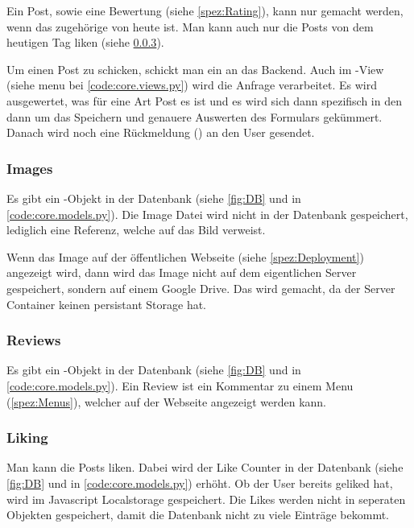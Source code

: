 Ein Post, sowie eine Bewertung (siehe \ref{spez:Rating}), kann nur gemacht
werden, wenn das zugehörige  von heute ist. Man kann auch nur die
Posts von dem heutigen Tag liken (siehe \ref{spez:Liking}).

Um einen Post zu schicken, schickt man ein  an das Backend.
Auch im -View (siehe menu bei {\ref{code:core.views.py}}) wird die
Anfrage verarbeitet. Es wird ausgewertet, was für eine Art Post es ist und es
wird sich dann spezifisch in den  dann um das Speichern
und genauere Auswerten des Formulars gekümmert. Danach wird noch eine
Rückmeldung () an den User gesendet.

\subsubsection{Images} \label{spez:Images}

Es gibt ein -Objekt in der Datenbank (siehe \ref{fig:DB} und in
\ref{code:core.models.py}). Die Image Datei wird nicht in der Datenbank
gespeichert, lediglich eine Referenz, welche auf das Bild verweist.

Wenn das Image auf der öffentlichen Webseite (siehe \ref{spez:Deployment}) angezeigt wird, dann
wird das Image nicht auf dem eigentlichen Server gespeichert, sondern auf einem
Google Drive. Das wird gemacht, da der Server Container keinen persistant
Storage hat.

\subsubsection{Reviews} \label{spez:Reviews}

Es gibt ein -Objekt in der Datenbank (siehe \ref{fig:DB} und in
\ref{code:core.models.py}). Ein Review ist ein Kommentar zu einem Menu
(\ref{spez:Menus}), welcher auf der Webseite angezeigt werden kann.

\subsubsection{Liking} \label{spez:Liking}

Man kann die Posts liken. Dabei wird der Like Counter in der Datenbank (siehe
\ref{fig:DB} und in \ref{code:core.models.py}) erhöht. Ob der User bereits
geliked hat, wird im Javascript Localstorage gespeichert. Die Likes werden nicht
in seperaten Objekten gespeichert, damit die Datenbank nicht zu viele Einträge
bekommt.

